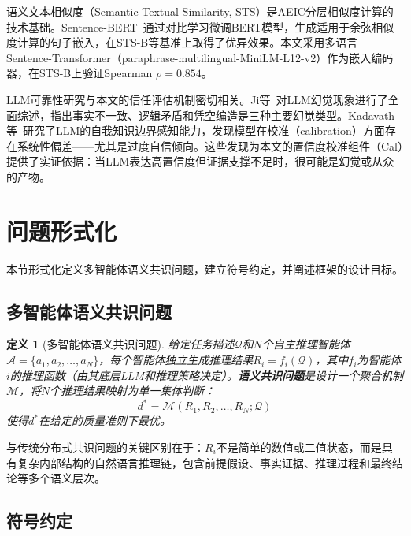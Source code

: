 \documentclass[12pt,a4paper,UTF8,fontset=fandol]{ctexart}
\newtheorem{definition}{定义}[section]
\begin{document}
语义文本相似度（Semantic Textual Similarity, STS）是AEIC分层相似度计算的技术基础。Sentence-BERT~\cite{reimers2019sentence}通过对比学习微调BERT模型，生成适用于余弦相似度计算的句子嵌入，在STS-B等基准上取得了优异效果。本文采用多语言Sentence-Transformer（paraphrase-multilingual-MiniLM-L12-v2）作为嵌入编码器，在STS-B上验证Spearman $\rho = 0.854$。

LLM可靠性研究与本文的信任评估机制密切相关。Ji等~\cite{ji2023hallucination}对LLM幻觉现象进行了全面综述，指出事实不一致、逻辑矛盾和凭空编造是三种主要幻觉类型。Kadavath等~\cite{kadavath2022language}研究了LLM的自我知识边界感知能力，发现模型在校准（calibration）方面存在系统性偏差——尤其是过度自信倾向。这些发现为本文的置信度校准组件（Cal）提供了实证依据：当LLM表达高置信度但证据支撑不足时，很可能是幻觉或从众的产物。

\section{问题形式化}\label{sec:formulation}

本节形式化定义多智能体语义共识问题，建立符号约定，并阐述框架的设计目标。

\subsection{多智能体语义共识问题}

\begin{definition}[多智能体语义共识问题]\label{def:consensus}
给定任务描述$\mathcal{Q}$和$N$个自主推理智能体$\mathcal{A} = \{a_1, a_2, \ldots, a_N\}$，每个智能体独立生成推理结果$R_i = f_i(\mathcal{Q})$，其中$f_i$为智能体$i$的推理函数（由其底层LLM和推理策略决定）。\textbf{语义共识问题}是设计一个聚合机制$\mathcal{M}$，将$N$个推理结果映射为单一集体判断：
\begin{equation}
d^* = \mathcal{M}(R_1, R_2, \ldots, R_N; \mathcal{Q})
\end{equation}
使得$d^*$在给定的质量准则下最优。
\end{definition}

与传统分布式共识问题的关键区别在于：$R_i$不是简单的数值或二值状态，而是具有复杂内部结构的自然语言推理链，包含前提假设、事实证据、推理过程和最终结论等多个语义层次。

\subsection{符号约定}
\end{document}
